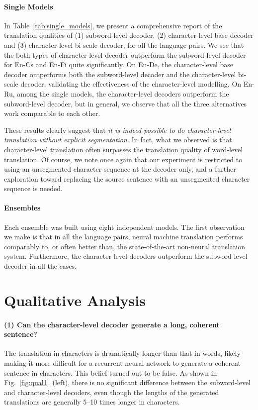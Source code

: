 \documentclass[11pt]{article}
\begin{document}
\paragraph{Single Models}
In Table~\ref{tab:single_models}, we present a comprehensive report of the
translation qualities of (1) subword-level decoder, (2) character-level base
decoder and (3) character-level bi-scale decoder, for all the language pairs. We
see that the both types of character-level decoder outperform the subword-level
decoder for En-Cs and En-Fi quite significantly. On En-De, the
character-level base decoder outperforms both the subword-level
decoder and the character-level bi-scale decoder, validating the
effectiveness of the character-level modelling.
On En-Ru, among the single models, the character-level decoders
outperform the subword-level decoder, but in general, we observe that all the three
alternatives work comparable to each other. 

These results clearly suggest that
{\em it is indeed possible to do character-level translation without
explicit segmentation.} In fact, what we observed is that character-level
translation often surpasses the translation quality of
word-level translation. Of course, we note once again that our experiment is
restricted to using an unsegmented character sequence at the decoder only, and a
further exploration toward replacing the source sentence with an unsegmented
character sequence is needed.

\paragraph{Ensembles}
Each ensemble was built using eight independent models.
The first observation we make is that in all the language
pairs, neural machine translation performs comparably to, or often better than,
the state-of-the-art non-neural translation system. Furthermore, the
character-level decoders outperform the subword-level decoder in all the cases.

\section{Qualitative Analysis}

\paragraph{(1) Can the character-level decoder generate a long, coherent
sentence?}
The translation in characters is dramatically longer than that in words, likely
making it more difficult for a recurrent neural network to generate a coherent
sentence in characters. This belief turned out to be false.  As shown in
Fig.~\ref{fig:qual1}~(left), there is no significant difference between the
subword-level and character-level decoders, even though the lengths of the
generated translations are generally 5--10 times longer in characters.
\end{document}

